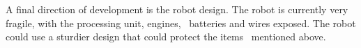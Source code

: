 A final direction of development is the robot design.
The robot is currently very fragile, with the processing unit, engines, \
batteries and wires exposed.
The robot could use a sturdier design that could protect the items \
mentioned above.



%
